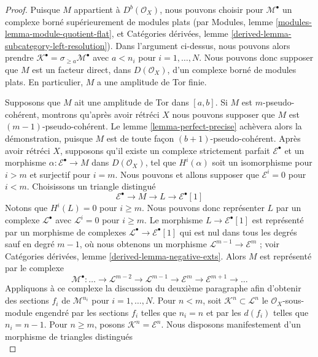 {\begin{proof}
\medskip\noindent
Puisque $M$ appartient à $D^b(\mathcal{O}_X)$, nous pouvons choisir pour $\mathcal{M}^\bullet$ un complexe borné supérieurement de modules plats (par Modules, lemme \ref{modules-lemma-module-quotient-flat}, et Catégories dérivées, lemme \ref{derived-lemma-subcategory-left-resolution}). Dans l'argument ci-dessus, nous pouvons alors prendre $\mathcal{K}^\bullet = \sigma_{\geq a}\mathcal{M}^\bullet$ avec $a < n_i$ pour $i = 1, \ldots, N$. Nous pouvons donc supposer que $M$ est un facteur direct, dans $D(\mathcal{O}_X)$, d'un complexe borné de modules plats. En particulier, $M$ a une amplitude de Tor finie.

\medskip\noindent

Supposons que $M$ ait une amplitude de Tor dans $[a, b]$. Si $M$ est $m$-pseudo-cohérent, montrons qu'après avoir rétréci $X$ nous pouvons supposer que $M$ est
$(m - 1)$-pseudo-cohérent. Le lemme \ref{lemma-perfect-precise} achèvera alors la démonstration, puisque
$M$ est de toute façon $(b + 1)$-pseudo-cohérent. Après avoir rétréci $X$, supposons qu'il existe un complexe strictement parfait $\mathcal{E}^\bullet$ et un morphisme $\alpha : \mathcal{E}^\bullet \to M$
dans $D(\mathcal{O}_X)$, tel que $H^i(\alpha)$ soit un isomorphisme pour
$i > m$ et surjectif pour $i = m$. Nous pouvons et allons supposer que $\mathcal{E}^i = 0$ pour $i < m$. Choisissons un triangle distingué
$$
\mathcal{E}^\bullet \to M \to L \to \mathcal{E}^\bullet[1]
$$
Notons que $H^i(L) = 0$ pour $i \geq m$. Nous pouvons donc représenter
$L$ par un complexe $\mathcal{L}^\bullet$ avec $\mathcal{L}^i = 0$
pour $i \geq m$. Le morphisme $L \to \mathcal{E}^\bullet[1]$
est représenté par un morphisme de complexes
$\mathcal{L}^\bullet \to \mathcal{E}^\bullet[1]$
qui est nul dans tous les degrés sauf en degré $m - 1$,
où nous obtenons un morphisme $\mathcal{L}^{m - 1} \to \mathcal{E}^m$ ; voir Catégories dérivées, lemme \ref{derived-lemma-negative-exts}. Alors $M$ est représenté par le complexe
$$
\mathcal{M}^\bullet :
\ldots \to
\mathcal{L}^{m - 2} \to
\mathcal{L}^{m - 1} \to
\mathcal{E}^m \to
\mathcal{E}^{m + 1} \to \ldots
$$
Appliquons à ce complexe la discussion du deuxième paragraphe afin d'obtenir des sections $f_i$ de $\mathcal{M}^{n_i}$ pour $i = 1, \ldots, N$. Pour $n < m$, soit $\mathcal{K}^n \subset \mathcal{L}^n$
le $\mathcal{O}_X$-sous-module engendré par les sections
$f_i$ telles que $n_i = n$ et par les $d(f_i)$ telles que $n_i = n - 1$. Pour $n \geq m$, posons $\mathcal{K}^n = \mathcal{E}^n$. Nous disposons manifestement d'un morphisme de triangles distingués
$$
$$
\end{proof}}
